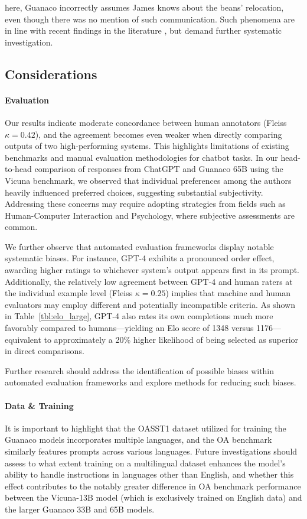here, {Guanaco} incorrectly assumes James knows about the beans’ relocation, even though there was no mention of such communication. Such phenomena are in line with recent findings in the literature \cite{sap2022neural}, but demand further systematic investigation.

\subsection{Considerations}
\label{ssec:considerations}

\paragraph{Evaluation}

Our results indicate moderate concordance between human annotators (Fleiss $\kappa=0.42$), and the agreement becomes even weaker when directly comparing outputs of two high-performing systems. This highlights limitations of existing benchmarks and manual evaluation methodologies for chatbot tasks. In our head-to-head comparison of responses from ChatGPT and {Guanaco} 65B using the Vicuna benchmark, we observed that individual preferences among the authors heavily influenced preferred choices, suggesting substantial subjectivity. Addressing these concerns may require adopting strategies from fields such as Human-Computer Interaction and Psychology, where subjective assessments are common.

We further observe that automated evaluation frameworks display notable systematic biases. For instance, GPT-4 exhibits a pronounced order effect, awarding higher ratings to whichever system’s output appears first in its prompt. Additionally, the relatively low agreement between GPT-4 and human raters at the individual example level (Fleiss $\kappa=0.25$) implies that machine and human evaluators may employ different and potentially incompatible criteria. As shown in Table~\ref{tbl:elo_large}, GPT-4 also rates its own completions much more favorably compared to humans—yielding an Elo score of 1348 versus 1176—equivalent to approximately a 20\% higher likelihood of being selected as superior in direct comparisons.

Further research should address the identification of possible biases within automated evaluation frameworks and explore methods for reducing such biases.

\paragraph{Data \& Training} It is important to highlight that the OASST1 dataset utilized for training the {Guanaco} models incorporates multiple languages, and the OA benchmark similarly features prompts across various languages. Future investigations should assess to what extent training on a multilingual dataset enhances the model's ability to handle instructions in languages other than English, and whether this effect contributes to the notably greater difference in OA benchmark performance between the Vicuna-13B model (which is exclusively trained on English data) and the larger {Guanaco} 33B and 65B models.

